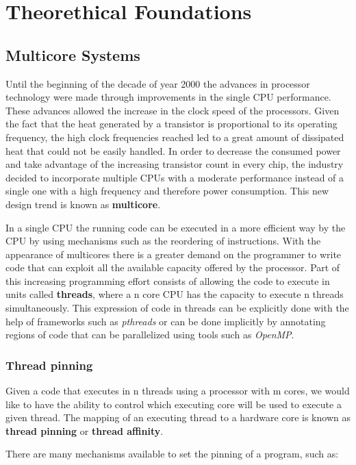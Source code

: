\chapter{Theorethical Foundations}\label{chapter:theorethical}
\section{Multicore Systems}\label{section:multicore}
Until the beginning of the decade of year 2000 the advances in processor technology were made through improvements in the single CPU performance. These advances allowed the increase in the clock speed of the processors. Given the fact that the heat generated by a transistor is proportional to its operating frequency, the high clock frequencies reached led to a great amount of dissipated heat that could not be easily handled. In order to decrease the consumed power and take advantage of the increasing transistor count in every chip, the industry decided to incorporate multiple CPUs with a moderate performance instead of a single one with a high frequency and therefore power consumption. This new design trend is known as \textbf{multicore}. 

In a single CPU the running code can be executed in a more efficient way by the CPU by using mechanisms such as the reordering of instructions. With the appearance of multicores there is a greater demand on the programmer to write code that can exploit all the available capacity offered by the processor. Part of this increasing programming effort consists of allowing the code to execute in units called \textbf{threads}, where a n core CPU has the capacity to execute n threads simultaneously. This expression of code in threads can be explicitly done with the help of frameworks such as \textit{pthreads} or can be done implicitly by annotating regions of code that can be parallelized using tools such as \textit{OpenMP}.

\subsection{Thread pinning}\label{subsection:pinning}
Given a code that executes in n threads using a processor with m cores, we would like to have the ability to control which executing core will be used to execute a given thread. The mapping of an executing thread to a hardware core is known as \textbf{thread pinning} or \textbf{thread affinity}.

There are many mechanisms available to set the pinning of a program, such as:

